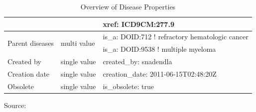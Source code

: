 \begin{table}[H]
{\begin{tabular}{|l|l|l|}
                                        &                                    & xref: ICD9CM:277.9                                                                                                                                                                                                                                                                                                   \\ \hline
\multirow{2}{*}{Parent diseases}        & \multirow{2}{*}{multi value}       & is\_a: DOID:712 ! refractory hematologic cancer                                                                                                                                                                                                                                                                      \\ \cline{3-3} 
                                        &                                    & is\_a: DOID:9538 ! multiple myeloma                                                                                                                                                                                                                                                                                  \\ \hline
Created by                              & single value                       & created\_by: snadendla                                                                                                                                                                                                                                                                                               \\ \hline
Creation date                           & single value                       & creation\_date: 2011-06-15T02:48:20Z                                                                                                                                                                                                                                                                                 \\ \hline
Obsolete                                & single value                       & is\_obsolete: true                                                                                                                                                                                                                                                                                                   \\ \hline
\end{tabular}
}
\caption{Overview of Disease Properties}
Source: \citep{do}
\label{Tab_Disease_Properties}
\end{table}

